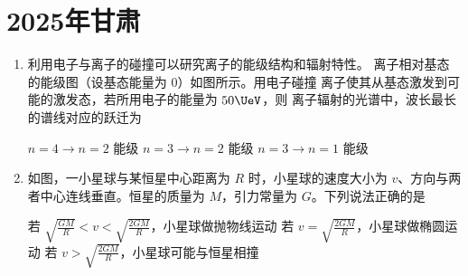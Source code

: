 \documentclass[\gkver]{gaokaozhenti}
\begin{document}
\chapter{2025年甘肃}

\begin{enumerate}
\item
利用电子与离子的碰撞可以研究离子的能级结构和辐射特性。 离子相对基态的能级图（设基态能量为 0）如图所示。用电子碰撞  离子使其从基态激发到可能的激发态，若所用电子的能量为 $50 \UeV$，则  离子辐射的光谱中，波长最长的谱线对应的跃迁为


{$n = 4 \to n = 2$ 能级}
{$n = 3 \to n = 2$ 能级}
{$n = 3 \to n = 1$ 能级}


\item
如图，一小星球与某恒星中心距离为 $R$ 时，小星球的速度大小为 $v$、方向与两者中心连线垂直。恒星的质量为 $M$，引力常量为 $G$。下列说法正确的是

\onepicture[w=3.40cm]{}

{若 $\sqrt{\frac{GM}{R}} < v < \sqrt{\frac{2GM}{R}}$，小星球做抛物线运动}
{若 $v = \sqrt{\frac{2GM}{R}}$，小星球做椭圆运动}
{若 $v > \sqrt{\frac{2GM}{R}}$，小星球可能与恒星相撞}

\end{enumerate}
\end{document}

